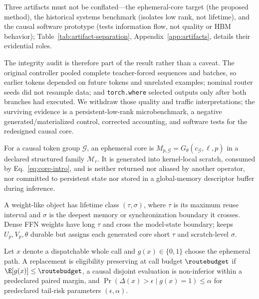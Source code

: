 Three artifacts must not be conflated---the ephemeral-core target (the
proposed method), the historical systems benchmark (isolates low rank, not
lifetime), and the causal software prototype (tests information flow, not
quality or HBM behavior); Table~\ref{tab:artifact-separation},
Appendix~\ref{app:artifacts}, details their evidential roles.

The integrity audit is therefore part of the result rather than a caveat.  The
original controller pooled complete teacher-forced sequences and batches, so
earlier tokens depended on future tokens and unrelated examples; nominal
router seeds did not resample data; and \texttt{torch.where} selected outputs
only after both branches had executed.  We withdraw those quality and traffic
interpretations; the surviving evidence is a persistent-low-rank
microbenchmark, a negative generated/materialized control, corrected
accounting, and software tests for the redesigned causal core.

\begin{definition}
For a causal token group $\mathcal G$, an ephemeral core is
$M_{p,\mathcal G}=G_\theta(c_{\mathcal G},\ell,p)$ in a declared structured
family $\mathcal M_r$.  It is generated into kernel-local scratch, consumed by
Eq.~\eqref{eq:core-intro}, and is neither returned nor aliased by another
operator, nor committed to persistent state nor stored in a global-memory
descriptor buffer during inference.
\end{definition}

\begin{definition}
A weight-like object has lifetime class $(\tau,\sigma)$, where $\tau$ is its
maximum reuse interval and $\sigma$ is the deepest memory or synchronization
boundary it crosses. Dense FFN weights have long $\tau$ and cross the
model-state boundary; \mwg{} keeps $U_p,V_p,\theta$ durable but assigns each
generated core short $\tau$ and scratch-level $\sigma$.
\end{definition}

\begin{definition}
Let $x$ denote a dispatchable whole call and $g(x)\in\{0,1\}$ choose the
ephemeral path.  A replacement is eligibility preserving at call budget
$\routebudget$ if $\E[g(x)]\le\routebudget$, a causal disjoint evaluation is
non-inferior within a predeclared paired margin, and
$\Pr(\Delta(x)>\epsilon\mid g(x)=1)\le\alpha$ for predeclared tail-risk
parameters $(\epsilon,\alpha)$.
\end{definition}

